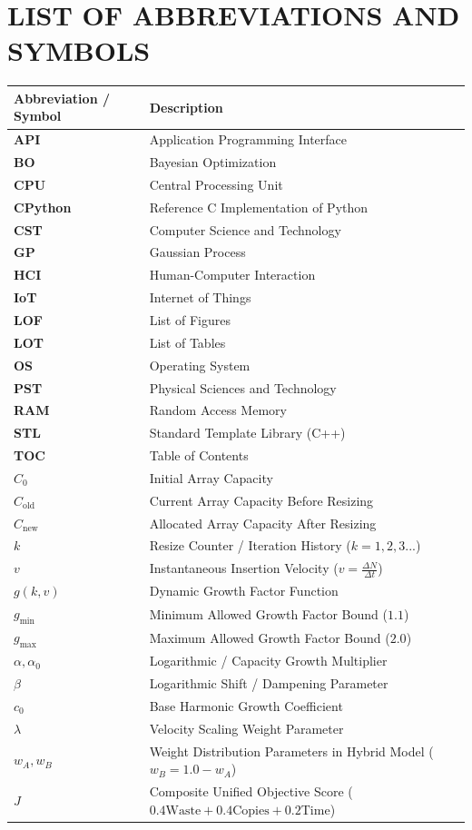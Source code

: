 \chapter*{LIST OF ABBREVIATIONS AND SYMBOLS}

\begin{table}[H]
\centering
\begin{tabularx}{\linewidth}{lX}
\textbf{Abbreviation / Symbol} & \textbf{Description} \\
\midrule
\textbf{API} & Application Programming Interface \\
\textbf{BO} & Bayesian Optimization \\
\textbf{CPU} & Central Processing Unit \\
\textbf{CPython} & Reference C Implementation of Python \\
\textbf{CST} & Computer Science and Technology \\
\textbf{GP} & Gaussian Process \\
\textbf{HCI} & Human-Computer Interaction \\
\textbf{IoT} & Internet of Things \\
\textbf{LOF} & List of Figures \\
\textbf{LOT} & List of Tables \\
\textbf{OS} & Operating System \\
\textbf{PST} & Physical Sciences and Technology \\
\textbf{RAM} & Random Access Memory \\
\textbf{STL} & Standard Template Library (C++) \\
\textbf{TOC} & Table of Contents \\
\midrule
$C_0$ & Initial Array Capacity \\
$C_{\text{old}}$ & Current Array Capacity Before Resizing \\
$C_{\text{new}}$ & Allocated Array Capacity After Resizing \\
$k$ & Resize Counter / Iteration History ($k = 1, 2, 3...$) \\
$v$ & Instantaneous Insertion Velocity ($v = \frac{\Delta N}{\Delta t}$) \\
$g(k,v)$ & Dynamic Growth Factor Function \\
$g_{\min}$ & Minimum Allowed Growth Factor Bound ($1.1$) \\
$g_{\max}$ & Maximum Allowed Growth Factor Bound ($2.0$) \\
$\alpha, \alpha_0$ & Logarithmic / Capacity Growth Multiplier \\
$\beta$ & Logarithmic Shift / Dampening Parameter \\
$c_0$ & Base Harmonic Growth Coefficient \\
$\lambda$ & Velocity Scaling Weight Parameter \\
$w_A, w_B$ & Weight Distribution Parameters in Hybrid Model ($w_B = 1.0 - w_A$) \\
$J$ & Composite Unified Objective Score ($0.4\text{Waste} + 0.4\text{Copies} + 0.2\text{Time}$) \\
\bottomrule
\end{tabularx}
\end{table}

